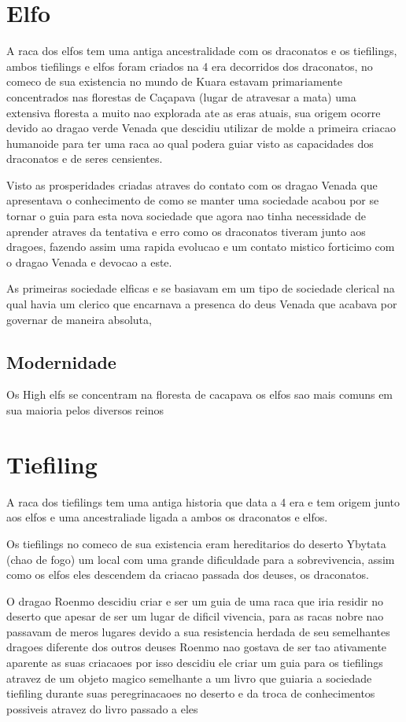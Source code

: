 \documentclass{book}
\begin{document}
\section{Elfo}
A raca dos elfos tem uma antiga ancestralidade com os draconatos e os tiefilings, ambos tiefilings 
e elfos foram criados na 4 era decorridos dos draconatos, no comeco de sua existencia no mundo 
de Kuara estavam primariamente concentrados nas florestas de Caçapava (lugar de atravesar a mata)
uma extensiva floresta a muito nao explorada ate as eras atuais, sua origem ocorre devido ao 
dragao verde Venada que descidiu utilizar de molde a primeira criacao humanoide para ter uma 
raca ao qual podera guiar visto as capacidades dos draconatos e de seres censientes. 

Visto as prosperidades criadas atraves do contato com os dragao Venada que apresentava o 
conhecimento de como se manter uma sociedade acabou por se tornar o guia para esta nova
sociedade que agora nao tinha necessidade de aprender atraves da tentativa e erro como os 
draconatos tiveram junto aos dragoes, fazendo assim uma rapida evolucao e um contato mistico 
forticimo com o dragao Venada e devocao a este.

As primeiras sociedade elficas e se basiavam em um tipo de sociedade clerical na qual havia um 
clerico que encarnava a presenca do deus Venada que acabava por governar de maneira absoluta,

\subsection*{Modernidade}
Os High elfs se concentram na floresta de cacapava os elfos sao mais comuns em sua maioria pelos 
diversos reinos 

\section{Tiefiling}
A raca dos tiefilings tem uma antiga historia que data a 4 era e tem origem junto aos elfos e 
uma ancestraliade ligada a ambos os draconatos e elfos.

Os tiefilings no comeco de sua existencia eram hereditarios do deserto Ybytata (chao de fogo) 
um local com uma grande dificuldade para a sobrevivencia, assim como os elfos eles descendem 
da criacao passada dos deuses, os draconatos.

O dragao Roenmo descidiu criar e ser um guia de uma raca que iria residir no deserto que apesar 
de ser um lugar de dificil vivencia, para as racas nobre nao passavam de meros lugares devido 
a sua resistencia herdada de seu semelhantes dragoes diferente dos outros deuses Roenmo nao 
gostava de ser tao ativamente aparente as suas criacaoes por isso descidiu ele criar um guia 
para os tiefilings atravez de um objeto magico semelhante a um livro que guiaria a sociedade 
tiefiling durante suas peregrinacaoes no deserto e da troca de conhecimentos possiveis atravez
do livro passado a eles
\end{document}
